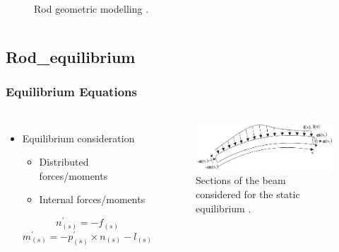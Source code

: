 \documentclass[compress]{thesisbeamer}
\begin{document}
\begin{frame}
\begin{columns}
\begin{figure}[h]
				\caption{Rod geometric modelling \cite{till_statics_2019}.}
			\end{figure}
			\end{columns}
		\end{frame}

        \subsection{Rod_equilibrium}
        \begin{frame}
        	\frametitle{Equilibrium Equations}
			\begin{columns}
			\begin{itemize}%
  				\item Equilibrium consideration
  				\begin{itemize}%
   					\item Distributed forces/moments
   					\item Internal forces/moments
  				\end{itemize}
  				\begin{equation}
  					{n}_{(s)}^{'} = - {f}_{(s)}
  				\end{equation}
  				\begin{equation}
  					{m}_{(s)}^{'} = - {p}_{(s)}^{'} × {n}_{(s)} - {l}_{(s)}
  				\end{equation}
 			\end{itemize}
			\vspace{2cm}
			\begin{figure}[h]
				\centering
				\includegraphics[width=\textwidth]{images/equilibrium}
				\caption{Sections of the beam considered for the static equilibrium \cite{black_parallel_2018}.}
			\end{figure}
			\end{columns}
		\end{frame}
\end{document}
